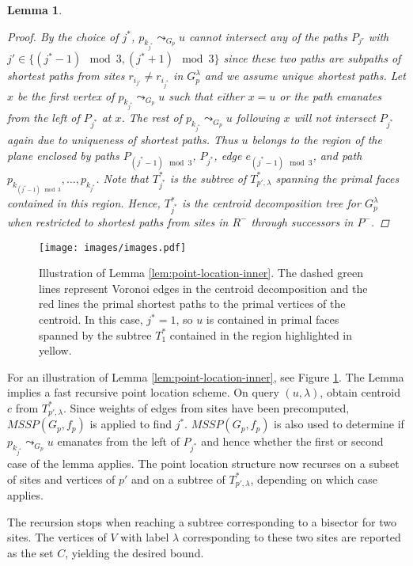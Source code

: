 \documentclass[a4paper,UKenglish,cleveref, autoref, thm-restate]{article}
\newtheorem{lemma}{Lemma}
\begin{document}
\begin{lemma}
\begin{proof}
By the choice of $j^*$, $p_{k_{j^*}}\leadsto_{G_p} u$ cannot intersect any of the paths $P_{j'}$ with $j'\in\{(j^*-1)\mod 3,(j^*+1)\mod 3\}$ since these two paths are subpaths of shortest paths from sites $r_{i_{j'}}\neq r_{i_{j^*}}$ in $G_p^\lambda$ and we assume unique shortest paths. Let $x$ be the first vertex of $p_{k_{j^*}}\leadsto_{G_p} u$ such that either $x = u$ or the path emanates from the left of $P_{j^*}$ at $x$. The rest of $p_{k_{j^*}}\leadsto_{G_p} u$ following $x$ will not intersect $P_{j^*}$ again due to uniqueness of shortest paths. Thus $u$ belongs to the region of the plane enclosed by paths $P_{(j^*-1)\mod 3}$, $P_{j^*}$, edge $e_{(j^*-1)\mod 3}$, and path $p_{k_{(j^*-1)\mod 3}},\ldots,p_{k_{j^*}}$. Note that $T^*_{j^*}$ is the subtree of $T^*_{p',\lambda}$ spanning the primal faces contained in this region. Hence, $T^*_{j^*}$ is the centroid decomposition tree for $G_p^\lambda$ when restricted to shortest paths from sites in $R^-$ through successors in $P^-$. 
\end{proof}
\end{lemma}

\begin{figure}
    \centering
    \texttt{[image: images/images.pdf]}
    \caption{Illustration of Lemma \ref{lem:point-location-inner}. The dashed green lines represent Voronoi edges in the centroid decomposition and the red lines the primal shortest paths to the primal vertices of the centroid. In this case, $j^* = 1$, so $u$ is contained in primal faces spanned by the subtree $T^*_{1}$ contained in the region highlighted in yellow. }
    \label{fig:point-location}
\end{figure}

For an illustration of Lemma \ref{lem:point-location-inner}, see Figure \ref{fig:point-location}. The Lemma implies a fast recursive point location scheme. On query $(u,\lambda)$, obtain centroid $c$ from $T^*_{p',\lambda}$. Since weights of edges from sites have been precomputed, $\textit{MSSP}(G_p,f_p)$ is applied to find $j^*$. $\textit{MSSP}(G_p,f_p)$ is also used to determine if $p_{k_{j^*}}\leadsto_{G_p} u$ emanates from the left of $P_{j^*}$ and hence whether the first or second case of the lemma applies. The point location structure now recurses on a subset of sites and vertices of $p'$ and on a subtree of $T^*_{p',\lambda}$, depending on which case applies.

The recursion stops when reaching a subtree corresponding to a bisector for two sites. The vertices of $V$ with label $\lambda$ corresponding to these two sites are reported as the set $C$, yielding the desired bound. 
\end{document}
